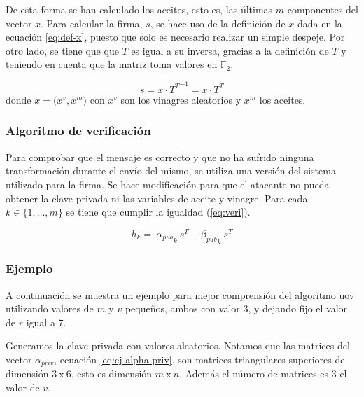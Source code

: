 De esta forma se han calculado los aceites, esto es, las últimas $m$ componentes del vector $x$. Para calcular la firma, $s$, se hace uso de la definición de $x$  dada en la ecuación \ref{eq:def-x}, puesto que solo es necesario realizar un simple despeje. Por otro lado, se tiene que  que $T$ es igual a su inversa, gracias a la definición de $T$ y teniendo en cuenta que la matriz toma valores en $\mathds{F}_2$.

\begin{equation}\label{eq:firma}
	s = x \cdot {T^{\scriptscriptstyle T}}^{-1} = x \cdot T ^{\scriptscriptstyle T}
\end{equation}
donde $x = \big(x^v, x^m\big)$ con $x^v$ son los vinagres aleatorios y $x^m$ los aceites.




\subsubsection{Algoritmo de verificación}

Para comprobar que el mensaje es correcto y que no ha sufrido ninguna transformación durante el envío del mismo, se utiliza una versión del sistema utilizado para la firma. Se hace modificación para que el atacante no pueda obtener la clave privada ni las variables de aceite y vinagre. Para cada $k \in  \{1,\dots, m\}$ se tiene que cumplir la igualdad (\ref{eq:veri}).


\begin{equation}\label{eq:veri}
	h_k = \ {\alpha_{pub}}_k \ s^{\scriptscriptstyle T} + {\beta_{pub}}_{k} \ s^{\scriptscriptstyle T}
\end{equation}

\subsubsection{Ejemplo}

A continuación se muestra un ejemplo para mejor comprensión del algoritmo \acrshort{uov} utilizando valores de $m$ y $v$ pequeños, ambos con valor $3$, y dejando fijo el valor de $r$ igual a $7$.

Generamos la clave privada con valores aleatorios. Notamos que las matrices del vector $\alpha_{priv}$, ecuación \ref{eq:ej-alpha-priv}, son matrices triangulares superiores de dimensión $3\ \mathrm{x}\ 6$, esto es dimensión $m\ \mathrm{x}\ n$. Además el número de matrices es $3$ el valor de $v$.


